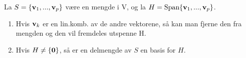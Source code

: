 La $S = \{ \mathbf{v}_1, ..., \mathbf{v}_p \}$ være en mengde i V,
og la $H = \text{Span}\{\mathbf{v}_1, ..., \mathbf{v}_p\}$.
\begin{enumerate}
  \item Hvis $\mathbf{v}_k$ er en lin.komb. av de andre vektorene,
        så kan man fjerne den fra mengden
        og den vil fremdeles utspenne H.
  \item Hvis $H \neq \{ \mathbf{0} \}$, så er en delmengde av $S$ en basis for $H$.
\end{enumerate}
